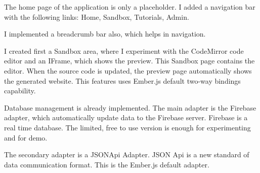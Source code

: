 The home page of the application is only a placeholder. I added a navigation bar with the following links: Home, Sandbox, Tutorials, Admin.

I implemented a breadcrumb bar also, which helps in navigation.

I created first a Sandbox area, where I experiment with the CodeMirror code editor and an IFrame, which shows the preview. This Sandbox page contains the editor. When the source code is updated, the preview page automatically shows the generated website. This features uses Ember.js default two-way bindings capability.

Database management is already implemented. The main adapter is the Firebase adapter, which automatically update data to the Firebase server. Firebase is a real time database. The limited, free to use version is enough for experimenting and for demo.

The secondary adapter is a JSONApi Adapter. JSON Api \cite{jsonapi} is a new standard of data communication format. This is the Ember.js default adapter.
